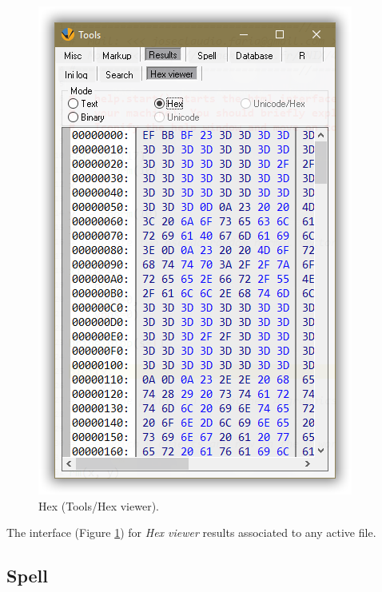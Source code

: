 \begin{figure}[H]
  \includegraphics[scale=0.35]{./res/tools_results_hex.png}
  \caption{Hex (Tools/Hex viewer).}
  \label{fig:tools_results_hex}
\end{figure}

The interface
(Figure \ref{fig:tools_results_hex})
for \textit{Hex viewer} results associated to any active file.


\hypertarget{working_tools_spell}{}
\subsection{Spell}

